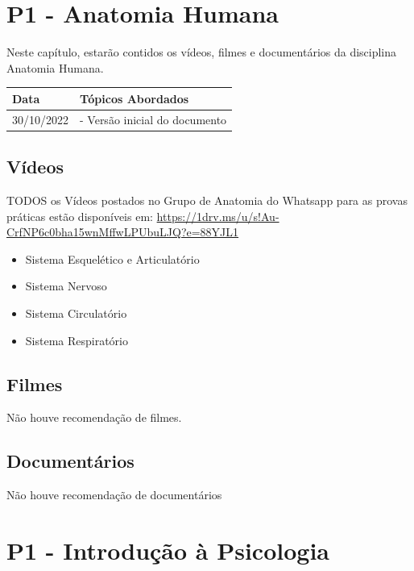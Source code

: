 \documentclass[
]{book}
\providecommand{\tightlist}{%
  \setlength{\itemsep}{0pt}\setlength{\parskip}{0pt}}
\begin{document}
\hypertarget{p1---anatomia-humana}{%
\chapter{P1 - Anatomia Humana}\label{p1---anatomia-humana}}

Neste capítulo, estarão contidos os vídeos, filmes e documentários da disciplina Anatomia Humana.

\begin{longtable}[]{@{}ll@{}}
\toprule()
Data & Tópicos Abordados \\
\midrule()
\endhead
30/10/2022 & - Versão inicial do documento \\
\bottomrule()
\end{longtable}

\hypertarget{vuxeddeos}{%
\section{Vídeos}\label{vuxeddeos}}

TODOS os Vídeos postados no Grupo de Anatomia do Whatsapp para as provas práticas estão disponíveis em: \url{https://1drv.ms/u/s!Au-CrfNP6c0bha15wnMffwLPUbuLJQ?e=88YJL1}

\begin{itemize}
\tightlist
\item
  Sistema Esquelético e Articulatório
\item
  Sistema Nervoso
\item
  Sistema Circulatório
\item
  Sistema Respiratório
\end{itemize}

\hypertarget{filmes}{%
\section{Filmes}\label{filmes}}

Não houve recomendação de filmes.

\hypertarget{documentuxe1rios}{%
\section{Documentários}\label{documentuxe1rios}}

Não houve recomendação de documentários

\hypertarget{p1---introduuxe7uxe3o-uxe0-psicologia}{%
\chapter{P1 - Introdução à Psicologia}\label{p1---introduuxe7uxe3o-uxe0-psicologia}}
\end{document}
